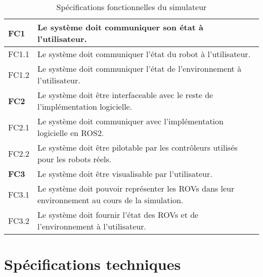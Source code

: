 \begin{table}[!htb]
\begin{adjustbox}{max width=\textwidth}
\begin{tabularx}{\textwidth}{|lX|}
                    \hline \hline
            
                    \cellcolor{orange!40}\textbf{FC1} &\cellcolor{orange!30} Le système doit communiquer son état à l'utilisateur. \\
                    \hline
                    \cellcolor{gray!10}FC1.1& Le système doit communiquer l'état du robot à l'utilisateur. \\
                    \hline
                    \cellcolor{gray!10}FC1.2& Le système doit communiquer l'état de l'environnement à l'utilisateur.\\
                    \hline
            
                    \hline \hline
            
                    \cellcolor{orange!40}\textbf{FC2}&\cellcolor{orange!30} Le système doit être interfaceable avec le reste de l'implémentation logicielle. \\
                    \hline
                    \cellcolor{gray!10}FC2.1& Le système doit communiquer avec l'implémentation logicielle en \gls{ROS2}. \\
                    \hline
                    \cellcolor{gray!10}FC2.2& Le système doit être pilotable par les contrôleurs utilisés pour les robots réels. \\
                    \hline

                    \hline \hline
            
                    \cellcolor{orange!40}\textbf{FC3}&\cellcolor{orange!30} Le système doit être visualisable par l'utilisateur. \\
                    \hline
                    \cellcolor{gray!10}FC3.1& Le système doit pouvoir représenter les \gls{ROV}s dans leur environnement au cours de la simulation. \\
                    \hline
                    \cellcolor{gray!10}FC3.2& Le système doit fournir l'état des \gls{ROV}s et de l'environnement à l'utilisateur.  \\
                    \hline
                \end{tabularx}
            \end{adjustbox}
            \caption{Spécifications fonctionnelles du simulateur}
            \label{table:specs}
        \end{table}    

    \section{Spécifications techniques}

